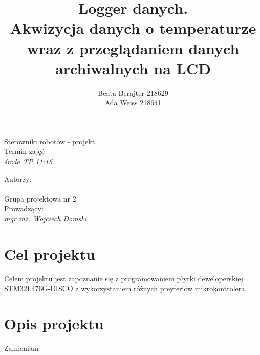 \documentclass[a4paper,12pt]{article}
\author{Beata Berajter 218629\\
Ada Weiss 218641 }%
\title{Logger danych.\\Akwizycja danych o temperaturze wraz z przeglądaniem danych archiwalnych na LCD }
\makeatletter
\renewcommand{\maketitle}{\begin{titlepage}  
    \vspace*{1cm}
    \begin{center}
  Sterowniki robotów - projekt\\
Termin zajęć\\
\textit{środa TP 11:15}
    \end{center}
      \vspace{3cm}
    \begin{center}
     \LARGE \textsc {\@title}
         \end{center}
     \vspace{1cm}
    
    \begin{center}
    Autorzy:\\
   \textit{\@author} \\
\vspace{1cm}
Grupa projektowa nr 2\\
\vspace{2cm}
Prowadzący:\\
 \textit{mgr inż. Wojciech Domski}

     \end{center}
      \vspace{1cm}
    
    
    \vspace*{\stretch{6}}
    \begin{center}
    \@date
    \end{center}
  \end{titlepage}
}
\makeatother
\begin{document}
\newpage
\maketitle
\newpage
\tableofcontents

\newpage
\section{Cel projektu}
Celem projektu jest zapoznanie się z programowaniem płytki deweloperskiej STM32L476G-DISCO z wykorzystaniem różnych preyferiów mikrokontrolera.
\section{Opis projektu}
Zamieniam
\end{document}
